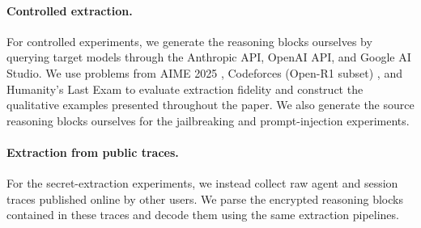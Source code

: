 \paragraph{Controlled extraction.}
For controlled experiments, we generate the reasoning blocks ourselves by querying target models through the Anthropic API, OpenAI API, and Google AI Studio. We use problems from AIME 2025 \citep{aime2025}, Codeforces (Open-R1 subset) \citep{codeforces}, and Humanity's Last Exam \citep{hle} to evaluate extraction fidelity and construct the qualitative examples presented throughout the paper. We also generate the source reasoning blocks ourselves for the jailbreaking and prompt-injection experiments.

\paragraph{Extraction from public traces.}
For the secret-extraction experiments, we instead collect raw agent and session traces published online by other users. We parse the encrypted reasoning blocks contained in these traces and decode them using the same extraction pipelines.

